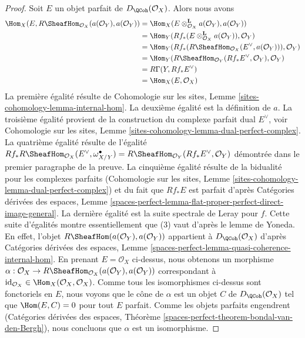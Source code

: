 \begin{proof}
\medskip\noindent
Soit $E$ un objet parfait de $D_\QCoh(\mathcal{O}_X)$. Alors
nous avons
\begin{align*}
\Hom_X(E, R\SheafHom_{\mathcal{O}_X}(a(\mathcal{O}_Y), a(\mathcal{O}_Y))
& =
\Hom_X(E \otimes_{\mathcal{O}_X}^\mathbf{L} a(\mathcal{O}_Y),
a(\mathcal{O}_Y)) \\
& =
\Hom_Y(Rf_*(E \otimes_{\mathcal{O}_X}^\mathbf{L} a(\mathcal{O}_Y)),
\mathcal{O}_Y) \\
& =
\Hom_Y(Rf_*(R\SheafHom_{\mathcal{O}_X}(E^\vee, a(\mathcal{O}_Y))),
\mathcal{O}_Y) \\
& =
\Hom_Y(R\SheafHom_{\mathcal{O}_Y}(Rf_*E^\vee, \mathcal{O}_Y),
\mathcal{O}_Y) \\
& =
R\Gamma(Y, Rf_*E^\vee) \\
& =
\Hom_X(E, \mathcal{O}_X)
\end{align*}
La première égalité résulte de Cohomologie sur les sites, Lemme
\ref{sites-cohomology-lemma-internal-hom}.
La deuxième égalité est la définition de $a$.
La troisième égalité provient de la construction du complexe parfait dual
$E^\vee$, voir Cohomologie sur les sites, Lemme
\ref{sites-cohomology-lemma-dual-perfect-complex}.
La quatrième égalité résulte de l'égalité
$Rf_*R\SheafHom_{\mathcal{O}_X}(E^\vee, \omega_{X/Y}^\bullet) =
R\SheafHom_{\mathcal{O}_Y}(Rf_*E^\vee, \mathcal{O}_Y)$
démontrée dans le premier paragraphe de la preuve.
La cinquième égalité résulte de la bidualité pour les complexes parfaits
(Cohomologie sur les sites, Lemme
\ref{sites-cohomology-lemma-dual-perfect-complex})
et du fait que $Rf_*E$ est parfait d'après
Catégories dérivées des espaces, Lemme
\ref{spaces-perfect-lemma-flat-proper-perfect-direct-image-general}.
La dernière égalité est la suite spectrale de Leray pour $f$.
Cette suite d'égalités montre essentiellement que (3)
vaut d'après le lemme de Yoneda. En effet, l'objet
$R\SheafHom(a(\mathcal{O}_Y), a(\mathcal{O}_Y))$
appartient à $D_\QCoh(\mathcal{O}_X)$ d'après Catégories dérivées des espaces, Lemme
\ref{spaces-perfect-lemma-quasi-coherence-internal-hom}.
En prenant $E = \mathcal{O}_X$ ci-dessus, nous obtenons un morphisme
$\alpha : \mathcal{O}_X \to
R\SheafHom_{\mathcal{O}_X}(a(\mathcal{O}_Y), a(\mathcal{O}_Y))$
correspondant à
$\text{id}_{\mathcal{O}_X} \in \Hom_X(\mathcal{O}_X, \mathcal{O}_X)$.
Comme tous les isomorphismes ci-dessus sont fonctoriels en $E$, nous
voyons que le cône de $\alpha$ est un objet $C$ de $D_\QCoh(\mathcal{O}_X)$
tel que $\Hom(E, C) = 0$ pour tout $E$ parfait.
Comme les objets parfaits engendrent
(Catégories dérivées des espaces, Théorème
\ref{spaces-perfect-theorem-bondal-van-den-Bergh}),
nous concluons que $\alpha$ est un isomorphisme.
\end{proof}









